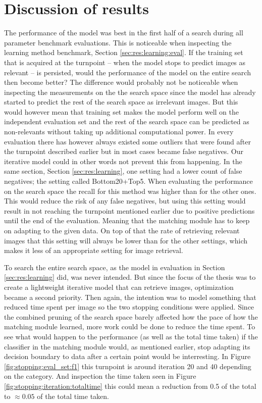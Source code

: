 
\section{Discussion of results}
\label{sec:concl:meas}
The performance of the model was best in the first half of a search during all parameter benchmark evaluations. This is noticeable when inspecting the learning method benchmark, Section \ref{sec:res:learning:eval}. If the training set that is acquired at the turnpoint -- when the model stops to predict images as relevant -- is persisted, would the performance of the model on the entire search then become better? The difference would probably not be noticeable when inspecting the measurements on the the search space since the model has already started to predict the rest of the search space as irrelevant images. But this would however mean that training set makes the model perform well on the independent evaluation set and the rest of the search space can be predicted as non-relevants without taking up additional computational power. In every evaluation there has however always existed some outliers that were found after the turnpoint described earlier but in most cases became false negatives. Our iterative model could in other words not prevent this from happening. 
In the same section, Section \ref{sec:res:learning}, one setting had a lower count of false negatives; the setting called Bottom20+Top5. When evaluating the performance on the search space the recall for this method was higher than for the other ones. This would reduce the risk of any false negatives, but using this setting would result in not reaching the turnpoint mentioned earlier due to positive predictions until the end of the evaluation. Meaning that the matching module has to keep on adapting to the given data. On top of that the rate of retrieving relevant images that this setting will always be lower than for the other settings, which makes it less of an appropriate setting for image retrieval. 

To search the entire search space, as the model in evaluation in Section \ref{sec:res:learning} did, was never intended. But since the focus of the thesis was to create a lightweight iterative model that can retrieve images, optimization became a second priority. Then again, the intention was to model something that reduced time spent per image so the two stopping 
conditions were applied. Since the combined pruning of the search space barely affected how the pace of how the matching module learned, more work could be done to reduce the time spent. To see what would happen to the performance (as well as the total time taken) if the classifier in the matching module would, as mentioned earlier, stop adapting its decision boundary to data after a certain point would be interresting. In Figure \ref{fig:stopping:eval_set:f1} this turnpoint is around iteration 20 and 40 depending on the category. And inspection the time taken seen in Figure \ref{fig:stopping:iteration:totaltime} this could mean a reduction from 0.5 of the total to $\approx0.05$ of the total time taken.  

